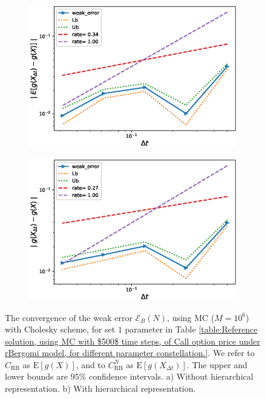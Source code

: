 \documentclass[11pt]{article}
\newcommand{\expt}[1]{\mathrm{E}\left[#1\right]}
\begin{document}
\FloatBarrier
\begin{figure}[h!]
	\centering
	\begin{subfigure}{.5\textwidth}
		\centering
		\includegraphics[width=1\linewidth]{./figures/rBergomi_weak_error_cholesky/weak_convergence_order_Bergomi_H_007_K_1_M_10_6_CI_relative_cholesky_hierarchical}
		\caption{}
		\label{fig:sub3}
	\end{subfigure}%
	\begin{subfigure}{.5\textwidth}
		\centering
		\includegraphics[width=1\linewidth]{./figures/rBergomi_weak_error_cholesky/weak_convergence_order_Bergomi_H_007_K_1_M_10_6_CI_relative_cholesky_non_hierarchical}
		\caption{}
		\label{fig:sub4}
	\end{subfigure}
	
	\caption{The  convergence of the weak error $\mathcal{E}_B(N)$, using MC ($M=10^6$) with Cholesky scheme, for set $1$ parameter in Table \ref{table:Reference solution, using MC with $500$ time steps, of Call option price under rBergomi model, for different parameter constellation.}. We refer to $C_{\text{RB}}$ as $\expt{g(X)}$, and to $C_{\text{RB}}^{N}$ as  $\expt{g(X_{\Delta t})}$. The upper and lower bounds are $95\%$ confidence intervals. a) Without hierarchical representation.  b) With hierarchical representation.}
	\label{fig:Weak_rate_set1_set_2_without_rich}
\end{figure}
\FloatBarrier
\end{document}
